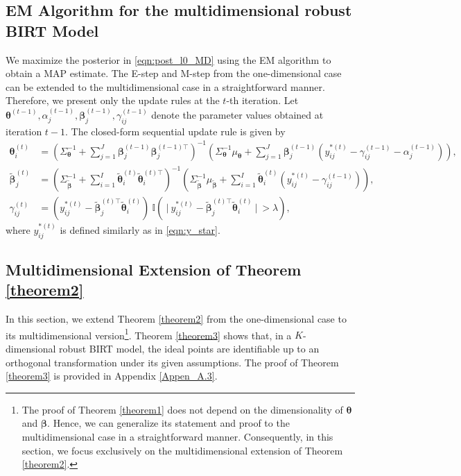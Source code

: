 \documentclass[11pt]{article}
\begin{document}
\subsection{EM Algorithm for the multidimensional robust BIRT Model}\label{sub_sec_7.2}
We maximize the posterior in \eqref{eqn:post_l0_MD} using the EM algorithm to obtain a MAP estimate.
The E-step and M-step from the one-dimensional case can be extended to the multidimensional case in a straightforward manner. Therefore, we present only the update rules at the $t$-th iteration.  
Let $ \boldsymbol{\theta}^{(t-1)}, \alpha_j^{(t-1)}, \boldsymbol{\beta}_j^{(t-1)}, \gamma_{ij}^{(t-1)} $ denote the parameter values obtained at iteration $ t-1 $. The closed-form sequential update rule is given by
\begin{align*}
    \boldsymbol{\theta}_i^{(t)} 
    &= \left(\Sigma_{\boldsymbol{\theta}}^{-1} + \sum_{j = 1}^J \boldsymbol{\beta}_j^{(t-1)} \boldsymbol{\beta}_j^{(t-1)\top} \right)^{-1}  \left(\Sigma_{\boldsymbol{\theta}}^{-1} \mu_{\boldsymbol{\theta}} + \sum_{j = 1}^J \boldsymbol{\beta}_j^{(t-1)} \left(y_{ij}^{*(t)} - \gamma_{ij}^{(t-1)} - \alpha_j^{(t-1)}\right)\right), \\ 
    \tilde{\boldsymbol{\beta}}_j^{(t)} 
    &= \left(\Sigma_{\tilde{\boldsymbol{\beta}}}^{-1} + \sum_{i = 1}^I \tilde{\boldsymbol{\theta}}_i^{(t)} \tilde{\boldsymbol{\theta}}_i^{(t)\top}\right)^{-1}  \left( \Sigma_{\tilde{\boldsymbol{\beta}}}^{-1} \mu_{\tilde{\boldsymbol{\beta}}} + \sum_{i = 1}^I \tilde{\boldsymbol{\theta}}_i^{(t)} \left(y_{ij}^{*(t)} - \gamma_{ij}^{(t-1)}\right)\right), \\ 
    \gamma_{ij}^{(t)} 
    &= \left( y_{ij}^{*(t)} - \tilde{\boldsymbol{\beta}}_j^{(t)\top} \tilde{\boldsymbol{\theta}}_i^{(t)}\right) ~ \mathbb{I}\left(~\Big|~y_{ij}^{*(t)} - \tilde{\boldsymbol{\beta}}_j^{(t)\top}\tilde{\boldsymbol{\theta}}_i^{(t)}~\Big|~ > \lambda\right),
\end{align*}
where $ y_{ij}^{*(t)} $ is defined similarly as in \eqref{eqn:y_star}. 


\subsection{Multidimensional Extension of Theorem \ref{theorem2}}\label{sub_sec_7.3}
In this section, we extend Theorem \ref{theorem2} from the one-dimensional case to its multidimensional version\footnote{The proof of Theorem \ref{theorem1} does not depend on the dimensionality of $\boldsymbol{\theta}$ and $\boldsymbol{\beta}$. Hence, we can generalize its statement and proof to the multidimensional case in a straightforward manner. Consequently, in this section, we focus exclusively on the multidimensional extension of Theorem \ref{theorem2}.}. Theorem \ref{theorem3} shows that, in a $ K $-dimensional robust BIRT model, the ideal points are identifiable up to an orthogonal transformation under its given assumptions. The proof of Theorem \ref{theorem3} is provided in Appendix \ref{Appen_A.3}.
\end{document}
